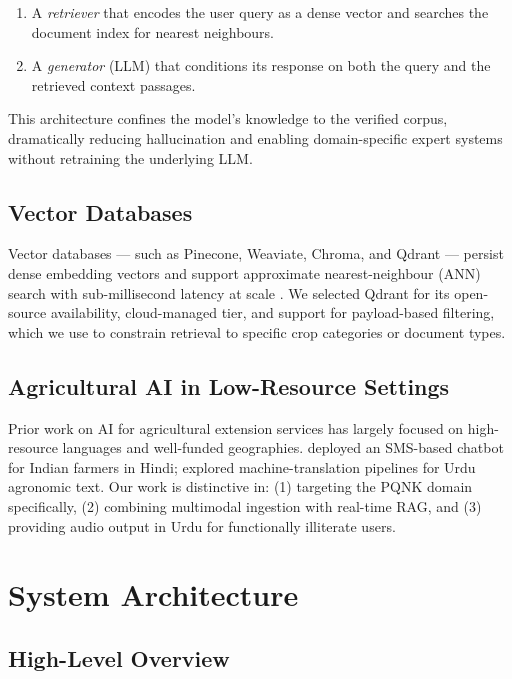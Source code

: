 \documentclass[12pt, a4paper]{article}
\begin{document}
\begin{onehalfspacing}
\begin{enumerate}[noitemsep]
  \item A \textit{retriever} that encodes the user query as a dense vector and
    searches the document index for nearest neighbours.
  \item A \textit{generator} (LLM) that conditions its response on both the query
    and the retrieved context passages.
\end{enumerate}

This architecture confines the model's knowledge to the verified corpus, dramatically
reducing hallucination and enabling domain-specific expert systems without
retraining the underlying LLM.

\subsection{Vector Databases}

Vector databases --- such as Pinecone, Weaviate, Chroma, and Qdrant --- persist
dense embedding vectors and support approximate nearest-neighbour (ANN) search
with sub-millisecond latency at scale \citep{qdrant2023}. We selected Qdrant for
its open-source availability, cloud-managed tier, and support for payload-based
filtering, which we use to constrain retrieval to specific crop categories or
document types.

\subsection{Agricultural AI in Low-Resource Settings}

Prior work on AI for agricultural extension services has largely focused on
high-resource languages and well-funded geographies. \citet{sharma2021} deployed
an SMS-based chatbot for Indian farmers in Hindi; \citet{ali2022} explored
machine-translation pipelines for Urdu agronomic text. Our work is distinctive in:
(1) targeting the PQNK domain specifically, (2) combining multimodal ingestion
with real-time RAG, and (3) providing audio output in Urdu for functionally
illiterate users.


\section{System Architecture}

\subsection{High-Level Overview}


\end{onehalfspacing}
\end{document}
